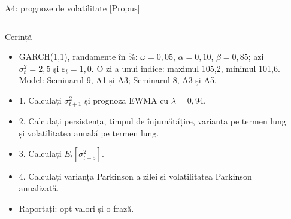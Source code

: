 \begin{frame}{A4: prognoze de volatilitate [Propus]}
\propsub
\itemsize{\scriptsize}
\begin{columns}[T]
\begin{column}{\taskw}
\begin{block}{Cerință}
\begin{itemize}
    \item GARCH(1,1), randamente în \%: $\omega = 0{,}05$, $\alpha = 0{,}10$, $\beta = 0{,}85$; azi $\sigma_t^2 = 2{,}5$ și $\varepsilon_t = 1{,}0$. O zi a unui indice: maximul 105,2, minimul 101,6. Model: Seminarul 9, A1 și A3; Seminarul 8, A3 și A5.
    \item 1. Calculați $\sigma_{t+1}^2$ și prognoza EWMA cu $\lambda = 0{,}94$.
    \item 2. Calculați persistența, timpul de înjumătățire, varianța pe termen lung și volatilitatea anuală pe termen lung.
    \item 3. Calculați $E_t[\sigma_{t+5}^2]$.
    \item 4. Calculați varianța Parkinson a zilei și volatilitatea Parkinson anualizată.
    \item Raportați: opt valori și o frază.
\end{itemize}
\end{block}
\end{column}
\begin{column}{\solw}
\end{column}
\end{columns}
\end{frame}

